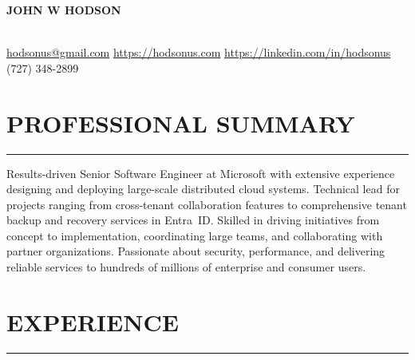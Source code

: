 \documentclass[11pt]{article}
\begin{document}
\noindent
\centerline{\huge \textbf{JOHN W HODSON}}\\[14pt] %
\vspace{0.2cm}
\href{mailto:hodsonus@gmail.com}{hodsonus@gmail.com} \hfill\href{https://hodsonus.com}{https://hodsonus.com} \hfill\href{https://linkedin.com/in/hodsonus}{https://linkedin.com/in/hodsonus} \hfill{(727) 348-2899}

\vspace{0.6cm}
\section*{PROFESSIONAL SUMMARY}
\hrule
\vspace{0.3cm}
\noindent
Results-driven Senior Software Engineer at Microsoft with extensive experience designing and deploying large-scale distributed cloud systems. Technical lead for projects ranging from cross-tenant collaboration features to comprehensive tenant backup and recovery services in Entra~ID. Skilled in driving initiatives from concept to implementation, coordinating large teams, and collaborating with partner organizations. Passionate about security, performance, and delivering reliable services to hundreds of millions of enterprise and consumer users.

\vspace{0.6cm}
\section*{EXPERIENCE}
\hrule
\vspace{0.3cm}
\end{document}
